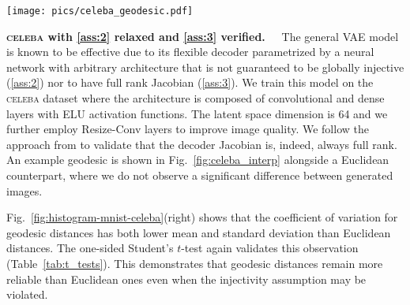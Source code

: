 \begin{SCfigure*}[1][t]
  \texttt{[image: pics/celeba\_geodesic.pdf]} 
  \caption{Geodesic (top) and Euclidean (bottom) interpolations, are highly similar, but distances still differ significantly (Fig.~\ref{fig:histogram-mnist-celeba}). }
  \label{fig:celeba_interp}
\end{SCfigure*}


\textbf{\textsc{celeba} with \ref{ass:2} relaxed and \ref{ass:3} verified.~~}
The general VAE model is known to be effective due to its flexible decoder parametrized by a neural network with arbitrary architecture that is not guaranteed to be globally injective (\ref{ass:2}) nor to have full rank Jacobian (\ref{ass:3}). We train this model on the \textsc{celeba} dataset \cite{liu2015faceattributes} where the architecture is composed of convolutional and dense layers with ELU activation functions. The latent space dimension is 64 and we further employ Resize-Conv layers \cite{odena2016deconvolution} to improve image quality.
We follow the approach from \citet{8575533} to validate that the decoder Jacobian is, indeed, always full rank. An example geodesic is shown in Fig.~\ref{fig:celeba_interp} alongside a Euclidean counterpart, where we do not observe a significant difference between generated images.


Fig.~\ref{fig:histogram-mnist-celeba}(right) shows that the coefficient of variation for geodesic distances has both lower mean and standard deviation than Euclidean distances. The one-sided Student's $t$-test again validates this observation (Table~\ref{tab:t_tests}). This demonstrates that geodesic distances remain more reliable than Euclidean ones even when the injectivity assumption may be violated.



